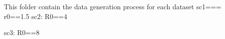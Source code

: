 This folder contain the data generation process for each dataset sc1=== r0==1.5
sc2:
R0==4

sc3:
R0==8
